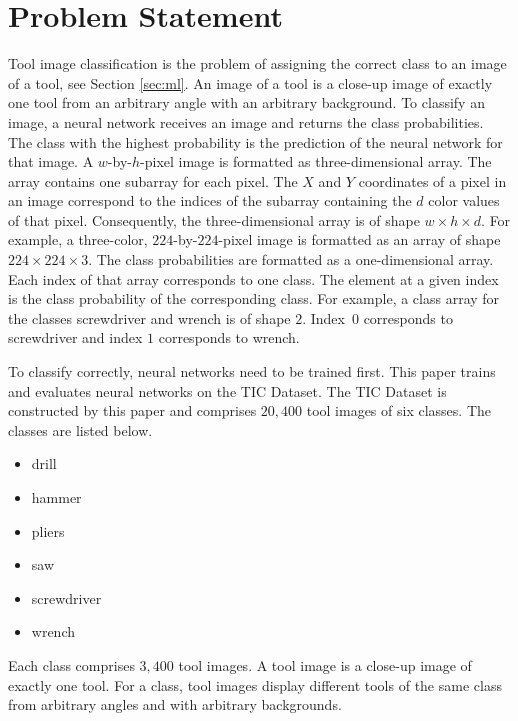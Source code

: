 \section{Problem Statement}
\label{sec:problem}
Tool image classification is the problem of assigning the correct class to an image of a tool, see Section \ref{sec:ml}. An image of a tool is a close-up image of exactly one tool from an arbitrary angle with an arbitrary background. To classify an image, a neural network receives an image and returns the class probabilities. The class with the highest probability is the prediction of the neural network for that image.
A $w$-by-$h$-pixel image is formatted as three-dimensional array. The array contains one subarray for each pixel. The $X$ and $Y$ coordinates of a pixel in an image correspond to the indices of the subarray containing the $d$ color values of that pixel. Consequently, the three-dimensional array is of shape $w \times h \times d$. \autocites{LeCun.2015b}{LeCun.1998} For example, a three-color, $224$-by-$224$-pixel image is formatted as an array of shape $224 \times 224 \times 3$. The class probabilities are formatted as a one-dimensional array. Each index of that array corresponds to one class. The element at a given index is the class probability of the corresponding class. \autocite{ElAmir.2020} For example, a class array for the classes screwdriver and wrench is of shape $2$. Index~$0$ corresponds to screwdriver and index $1$ corresponds to wrench.
\par
To classify correctly, neural networks need to be trained first. \autocite{ElAmir.2020} This paper trains and evaluates neural networks on the \ac{TIC Dataset}.  The \ac{TIC Dataset} is constructed by this paper and comprises $20{,}400$ tool images of six classes. The classes are listed below.
\begin{itemize}
	\item drill
	\item hammer
	\item pliers
	\item saw
	\item screwdriver
	\item wrench
\end{itemize}
Each class comprises $3{,}400$ tool images. A tool image is a close-up image of exactly one tool. 
For a class, tool images display different tools of the same class from arbitrary angles and with arbitrary backgrounds. 



